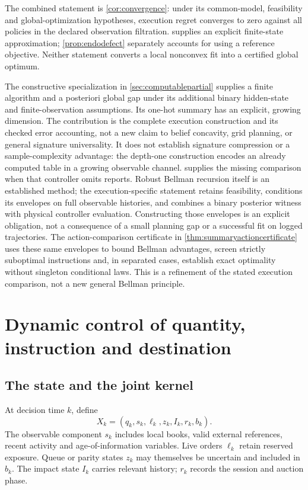 \documentclass[11pt]{article}
\numberwithin{equation}{section}
\theoremstyle{definition}
\theoremstyle{remark}
\theoremstyle{definition}
\begin{document}
The combined statement is \cref{cor:convergence}: under its common-model,
feasibility and global-optimization hypotheses, execution regret converges
to zero against all policies in the declared observation filtration.
 supplies an explicit finite-state approximation;
\cref{prop:endodefect} separately accounts for using a reference objective.
Neither statement converts a local nonconvex fit into a certified global optimum.

The constructive specialization in \cref{sec:computablepartial} supplies a
finite algorithm and a posteriori global gap under its additional binary
hidden-state and finite-observation assumptions. Its one-hot summary has an
explicit, growing dimension. The contribution is the complete execution
construction and its checked error accounting, not a new claim to belief
concavity, grid planning, or general signature universality.
It does not establish signature compression or a sample-complexity advantage:
the depth-one construction encodes an already computed table in a growing
observable channel.  supplies the missing comparison
when that controller omits reports. Robust Bellman recursion itself is an
established method; the execution-specific statement retains feasibility,
conditions its envelopes on full observable histories, and combines a
binary posterior witness with physical controller evaluation. Constructing
those envelopes is an explicit obligation, not a consequence of a small
planning gap or a successful fit on logged trajectories.
The action-comparison certificate in \cref{thm:summaryactioncertificate}
uses these same envelopes to bound Bellman advantages, screen strictly
suboptimal instructions and, in separated cases, establish exact optimality
without singleton conditional laws. This is a refinement of the stated
execution comparison, not a new general Bellman principle.


\section{Dynamic control of quantity, instruction and destination}\label{sec:dp}

\subsection{The state and the joint kernel}

At decision time $k$, define
\begin{equation}\label{eq:state}
 X_k=(q_k,s_k,\ell_k,z_k,I_k,r_k,b_k).
\end{equation}
The observable component $s_k$ includes local books, valid external references,
recent activity and age-of-information variables. Live orders $\ell_k$ retain
reserved exposure. Queue or parity states $z_k$ may themselves be uncertain
and included in $b_k$. The impact state $I_k$ carries relevant history; $r_k$
records the session and auction phase.
\end{document}
